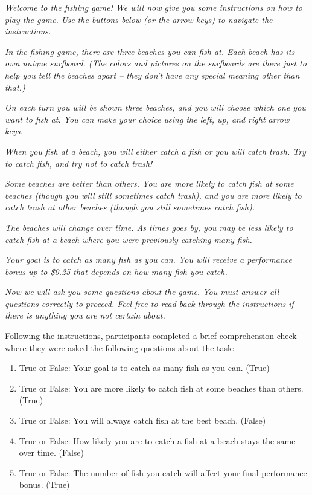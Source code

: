 \documentclass[a4paper,notitlepage,12pt]{article}
\begin{document}
\begin{refsection}[supp]
\textit{Welcome to the fishing game! We will now give you some instructions on how to play the game. Use the buttons below (or the arrow keys) to navigate the instructions.}

\textit{In the fishing game, there are three beaches you can fish at. Each beach has its own unique surfboard. (The colors and pictures on the surfboards are there just to help you tell the beaches apart – they don’t have any special meaning other than that.)}

\textit{On each turn you will be shown three beaches, and you will choose which one you want to fish at. You can make your choice using the left, up, and right arrow keys.}

\textit{When you fish at a beach, you will either catch a fish or you will catch trash. Try to catch fish, and try not to catch trash!}

\textit{Some beaches are better than others. You are more likely to catch fish at some beaches (though you will still sometimes catch trash), and you are more likely to catch trash at other beaches (though you still sometimes catch fish).}

\textit{The beaches will change over time. As times goes by, you may be less likely to catch fish at a beach where you were previously catching many fish.}

\textit{Your goal is to catch as many fish as you can. You will receive a performance bonus up to \$0.25 that depends on how many fish you catch.}

\textit{Now we will ask you some questions about the game. You must answer all questions correctly to proceed. Feel free to read back through the instructions if there is anything you are not certain about.}

Following the instructions, participants completed a brief comprehension check where they were asked the following questions about the task:

\begin{enumerate}
    \item True or False: Your goal is to catch as many fish as you can. (True)
    \item True or False: You are more likely to catch fish at some beaches than others. (True)
    \item True or False: You will always catch fish at the best beach. (False)
    \item True or False: How likely you are to catch a fish at a beach stays the same over time. (False)
    \item True or False: The number of fish you catch will affect your final performance bonus. (True)
\end{enumerate}


\end{refsection}
\end{document}
